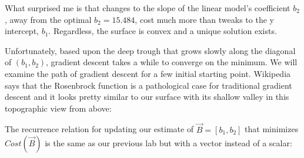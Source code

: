 \begin{fullwidth}
What surprised me is that changes to the slope of the linear model's coefficient $b_2$, away from the optimal $b_2=15.484$, cost much more than tweaks to the y intercept, $b_1$. Regardless, the surface is convex and a unique solution exists. 

Unfortunately, based upon the deep trough that grows slowly along the diagonal of $(b_1,b_2)$, gradient descent takes a while to converge on the minimum. We will examine the path of gradient descent for a few initial starting point. Wikipedia says that the Rosenbrock function is a pathological case for traditional gradient descent and it looks pretty similar to our surface with its shallow valley in this topographic view from above:


The recurrence relation for updating our estimate of $\vec{B}=[b_1, b_2]$ that minimizes $Cost(\vec{B})$ is the same as our previous lab but with a vector instead of a scalar:


\end{fullwidth}
